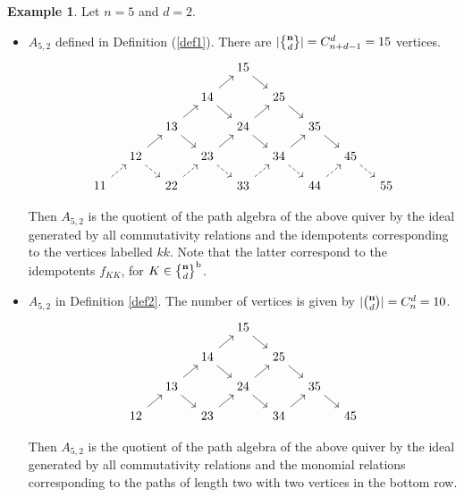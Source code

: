 \documentclass{amsart}
\theoremstyle{plain}
\theoremstyle{definition}
\newtheorem{Ex}[Thm]{Example}
\numberwithin{equation}{section}
\newcommand{\multiset}[2]{\genfrac{\{}{\}}{0pt}{1}{#1}{#2}}
\begin{document}
\begin{Ex}\label{eg}
Let $n=5$ and $d=2$. 
\begin{itemize}
\item $A_{5,2}$ defined in Definition (\ref{def1}). There are $|\multiset{\bf n}{d}|=C_{n+d-1}^d=15$ vertices.
\[\begin{tikzcd}[row sep=1em, column sep=1em]
&&&& 15 \\
&&& 14 && 25 \\
&& 13 && 24 && 35 \\
& 12 && 23 && 34 && 45 \\
11 && 22 && 33 && 44 && 55
\arrow[from=1-5, to=2-6]
\arrow[from=2-4, to=1-5]
\arrow[from=2-4, to=3-5]
\arrow[from=2-6, to=3-7]
\arrow[from=3-3, to=2-4]
\arrow[from=3-3, to=4-4]
\arrow[from=3-5, to=2-6]
\arrow[from=3-5, to=4-6]
\arrow[from=3-7, to=4-8]
\arrow[from=4-2, to=3-3]
\arrow[dashed, from=4-2, to=5-3]
\arrow[from=4-4, to=3-5]
\arrow[dashed, from=4-4, to=5-5]
\arrow[from=4-6, to=3-7]
\arrow[dashed, from=4-6, to=5-7]
\arrow[dashed, from=4-8, to=5-9]
\arrow[dashed, from=5-1, to=4-2]
\arrow[dashed, from=5-3, to=4-4]
\arrow[dashed, from=5-5, to=4-6]
\arrow[dashed, from=5-7, to=4-8]
\end{tikzcd}
\]

Then $A_{5,2}$ is the quotient of the path algebra of the above quiver by the ideal generated by all commutativity relations and the idempotents corresponding to the vertices labelled $kk$. Note that the latter correspond to the idempotents $f_{KK}$, for  $K\in\multiset{\bf n}{d}^{\mathrm{b}}$.




\item $A_{5,2}$ in Definition \ref{def2}. The number of vertices is given by $|\binom{\bf n}{d}|=C_n^d=10$.
\[\begin{tikzcd}[row sep=1em, column sep=1em]
	&&& 15 &&& \\
	&& 14 && 25 \\
	& 13 && 24 && 35 \\
	12 && 23 && 34 && 45
	\arrow[from=1-4, to=2-5]
	\arrow[from=2-3, to=1-4]
	\arrow[from=2-3, to=3-4]
	\arrow[from=2-5, to=3-6]
	\arrow[from=3-2, to=2-3]
	\arrow[from=3-2, to=4-3]
	\arrow[from=3-4, to=2-5]
	\arrow[from=3-4, to=4-5]
	\arrow[from=3-6, to=4-7]
	\arrow[from=4-1, to=3-2]
	\arrow[from=4-3, to=3-4]
	\arrow[from=4-5, to=3-6]
\end{tikzcd}\]

Then $A_{5,2}$ is the quotient of the path algebra of the above quiver by the ideal generated by all commutativity relations and the monomial relations corresponding to the paths of length two with two vertices in the bottom row. 


\end{itemize}
\end{Ex}
\end{document}
